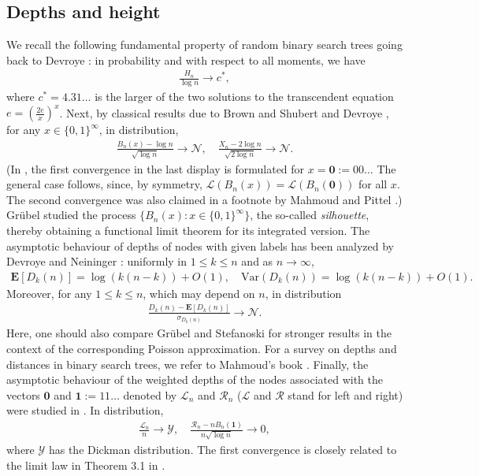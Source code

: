 \documentclass{amsart}       %
\newcommand{\sN}{\mathcal N}
\newcommand{\sY}{\mathcal Y}
\newcommand{\E}[1]{\ensuremath{\mathbf{E} \left[#1 \right]}}
\begin{document}
\subsection{Depths and height} \label{sec:dh} We recall the following fundamental property of random binary search trees going back to Devroye \cite{devroyeheight}: 
 in probability and with respect to all moments, we have
\begin{align} \label{conv_height} \frac{H_n}{\log n} \to c^*, \end{align}
where $c^* = 4.31 \ldots$ is the larger of the two solutions to the transcendent equation $e = (\frac{2e}{x} )^x$.  
Next, by classical results due to  Brown and Shubert \cite{brownshu} and Devroye \cite{dev88}, for any $x \in \{0,1\}^\infty$, in distribution,
\begin{align} \label{dev2} \frac{B_n(x) - \log n}{\sqrt{\log n}} \to \sN, \quad \frac{X_n - 2 \log n}{\sqrt{ 2\log n}} \to \sN. \end{align}
(In \cite[Theorem O1]{dev88}, the first convergence in the last display is formulated for $x = \mathbf{0} := 00\ldots$ The general case follows, since, by symmetry, $\mathcal L( B_n(x)) = \mathcal L( B_n (\mathbf 0)) $ 
for all $x$. The second convergence was also claimed in a footnote by Mahmoud and Pittel \cite{mapi84}.) 
Gr{\"u}bel \cite{gruebelsilhouette} studied the process $\{B_n(x): x \in \{0, 1 \}^\infty\} $, the so-called \emph{silhouette}, thereby obtaining a functional limit theorem for its integrated version.
The asymptotic behaviour of depths of nodes with given labels has been analyzed by Devroye and Neininger \cite{denefinger04}:
uniformly in $1\leq k \leq n$ and as $n \to \infty$,
\begin{align} \E{D_k(n)} = \log(k(n-k)) + O(1), \quad \text{Var}(D_k(n)) = \log(k(n-k)) + O(1). \label{expansionD} \end{align}
Moreover, for any $1 \leq k \leq n$, which may depend on $n$, in distribution
\begin{align}  \frac{D_k(n) - \E{D_k(n)}}{\sigma_{D_k(n)}} \to \sN.  \label{limDN} \end{align}
Here, one should also compare Gr{\"u}bel and Stefanoski \cite{gruebelpoisson05} for stronger results in the context of the corresponding Poisson approximation.
 For a survey on depths and distances in binary search trees, we refer to Mahmoud's book \cite{mahmoudbook}.
Finally, the asymptotic behaviour of the weighted depths of the nodes associated with the vectors $\mathbf 0$ and $\mathbf 1 := 11\ldots$ denoted by $\mathcal{L}_n$ and $\mathcal{R}_n$ ($\mathcal L$ and $\mathcal R$ 
stand for left and right) were studied  in \cite{aglama07}. In distribution, 
\begin{align} \label{lasm}
\frac{\mathcal{L}_n}{n} \to \sY, \quad \frac{\mathcal{R}_n - n B_n(\mathbf{1})}{n \sqrt{\log n}} \to 0, \end{align}
where $\sY$ has the Dickman distribution. The first convergence is closely related to the limit law in Theorem 3.1 in \cite{hwangtsai}.
\end{document}
